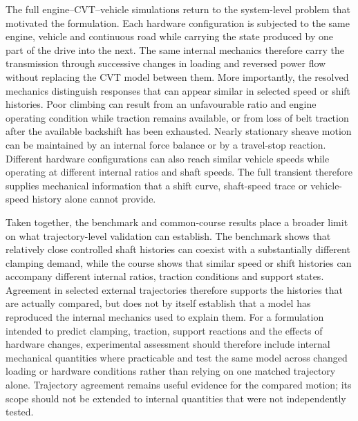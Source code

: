 \documentclass[11pt]{report}
\numberwithin{equation}{section}
\begin{document}
The full engine--CVT--vehicle simulations return to the system-level problem that motivated the
formulation. Each hardware configuration is subjected to the same engine, vehicle and continuous
road while carrying the state produced by one part of the drive into the next. The same internal
mechanics therefore carry the transmission through successive changes in loading and reversed
power flow without replacing the CVT model between them. More importantly, the resolved
mechanics distinguish responses that can appear similar in selected speed or shift histories.
Poor climbing can result from an unfavourable ratio and engine operating condition while traction
remains available, or from loss of belt traction after the available backshift has been exhausted.
Nearly stationary sheave motion can be maintained by an internal force balance or by a
travel-stop reaction. Different hardware configurations can also reach similar vehicle speeds
while operating at different internal ratios and shaft speeds. The full transient therefore
supplies mechanical information that a shift curve, shaft-speed trace or vehicle-speed history
alone cannot provide.

Taken together, the benchmark and common-course results place a broader limit on what
trajectory-level validation can establish. The benchmark shows that relatively close controlled
shaft histories can coexist with a substantially different clamping demand, while the course
shows that similar speed or shift histories can accompany different internal ratios, traction
conditions and support states. Agreement in selected external trajectories therefore supports
the histories that are actually compared, but does not by itself establish that a model has
reproduced the internal mechanics used to explain them. For a formulation intended to predict
clamping, traction, support reactions and the effects of hardware changes, experimental assessment
should therefore include internal mechanical quantities where practicable and test the same model
across changed loading or hardware conditions rather than relying on one matched trajectory
alone. Trajectory agreement remains useful evidence for the compared motion; its scope should
not be extended to internal quantities that were not independently tested.
\end{document}
